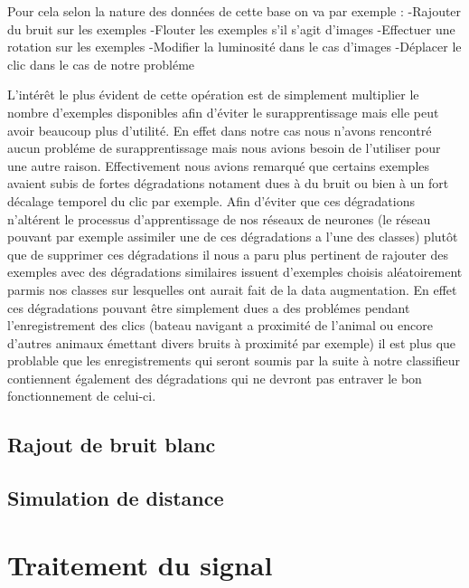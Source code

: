 Pour cela selon la nature des données de cette base on va par exemple :
-Rajouter du bruit sur les exemples
-Flouter les exemples s'il s'agit d'images
-Effectuer une rotation sur les exemples
-Modifier la luminosité dans le cas d'images
-Déplacer le clic dans le cas de notre probléme

L'intérêt le plus évident de cette opération est de simplement multiplier le nombre d'exemples disponibles afin d'éviter le surapprentissage mais elle peut avoir beaucoup plus d'utilité. En effet dans notre cas nous n'avons rencontré aucun probléme de surapprentissage mais nous avions besoin de l'utiliser pour une autre raison.
Effectivement nous avions remarqué que certains exemples avaient subis de fortes dégradations notament dues à du bruit ou bien à un fort décalage temporel du clic par exemple. Afin d'éviter que ces dégradations n'altérent le processus d'apprentissage de nos réseaux de neurones (le réseau pouvant par exemple assimiler une de ces dégradations a l'une des classes) plutôt que de supprimer ces dégradations il nous a paru plus pertinent de rajouter des exemples avec des dégradations similaires issuent d'exemples choisis aléatoirement parmis nos classes sur lesquelles ont aurait fait de la data augmentation. En effet ces dégradations pouvant être simplement dues a des problémes pendant l'enregistrement des clics (bateau navigant a proximité de l'animal ou encore d'autres animaux émettant divers bruits à proximité par exemple) il est plus que problable que les enregistrements qui seront soumis par la suite à notre classifieur contiennent également des dégradations qui ne devront pas entraver le bon fonctionnement de celui-ci.

\hypertarget{Rajout-de-bruit-blanc}{%
\subsection{Rajout de bruit blanc}
\label{Rajout-de-bruit-blanc}}

\hypertarget{Simulation-de-distance}{%
\subsection{Simulation de distance}
\label{Simulation-de-distance}}

\hypertarget{Traitement-du-signal}{%
\section{Traitement du signal}
\label{Traitement-du-signal}}

